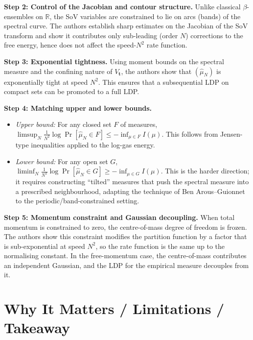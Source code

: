 \documentclass[11pt,a4paper]{article}
\theoremstyle{remark}
\begin{document}
\medskip\noindent
\textbf{Step 2: Control of the Jacobian and contour structure.}
Unlike classical $\beta$-ensembles on $\mathbb{R}$, the SoV variables are constrained to lie on arcs (bands) of the spectral curve.  The authors establish sharp estimates on the Jacobian of the SoV transform and show it contributes only sub-leading (order $N$) corrections to the free energy, hence does not affect the speed-$N^2$ rate function.

\medskip\noindent
\textbf{Step 3: Exponential tightness.}
Using moment bounds on the spectral measure and the confining nature of $V_{\mathbf{t}}$, the authors show that $(\hat\mu_N)$ is exponentially tight at speed $N^2$.  This ensures that a subsequential LDP on compact sets can be promoted to a full LDP.

\medskip\noindent
\textbf{Step 4: Matching upper and lower bounds.}
\begin{itemize}[nosep]
  \item \emph{Upper bound:} For any closed set $F$ of measures, $\limsup_{N}\frac{1}{N^2}\log\Pr[\hat\mu_N\in F]\le -\inf_{\mu\in F}I(\mu)$.  This follows from Jensen-type inequalities applied to the log-gas energy.
  \item \emph{Lower bound:} For any open set $G$, $\liminf_{N}\frac{1}{N^2}\log\Pr[\hat\mu_N\in G]\ge -\inf_{\mu\in G}I(\mu)$.  This is the harder direction; it requires constructing ``tilted'' measures that push the spectral measure into a prescribed neighbourhood, adapting the technique of Ben Arous--Guionnet to the periodic/band-constrained setting.
\end{itemize}

\medskip\noindent
\textbf{Step 5: Momentum constraint and Gaussian decoupling.}
When total momentum is constrained to zero, the centre-of-mass degree of freedom is frozen.
The authors show this constraint modifies the partition function by a factor that is sub-exponential at speed $N^2$, so the rate function is the same up to the normalising constant.
In the free-momentum case, the centre-of-mass contributes an independent Gaussian, and the LDP for the empirical measure decouples from it.

\section{Why It Matters / Limitations / Takeaway}
\end{document}

